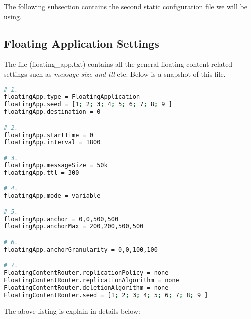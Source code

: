 The following subsection contains the second static configuration file we will be using.

\subsection{Floating Application Settings}
The file (floating\_app.txt) contains all the general floating content related settings such as \textit{message size and ttl} etc. Below is a snapshot of this file.
 \begin{lstlisting}[language=bash]
# 1.
floatingApp.type = FloatingApplication
floatingApp.seed = [1; 2; 3; 4; 5; 6; 7; 8; 9 ]
floatingApp.destination = 0

# 2.
floatingApp.startTime = 0
floatingApp.interval = 1800

# 3.
floatingApp.messageSize = 50k
floatingApp.ttl = 300

# 4.
floatingApp.mode = variable

# 5.
floatingApp.anchor = 0,0,500,500
floatingApp.anchorMax = 200,200,500,500

# 6.
floatingApp.anchorGranularity = 0,0,100,100

# 7.
FloatingContentRouter.replicationPolicy = none
FloatingContentRouter.replicationAlgorithm = none
FloatingContentRouter.deletionAlgorithm = none
FloatingContentRouter.seed = [1; 2; 3; 4; 5; 6; 7; 8; 9 ]
\end{lstlisting}
\vspace{4mm}
The above listing is explain in details below:
